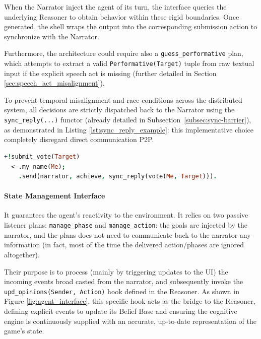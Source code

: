 When the Narrator inject the agent of its turn, the interface queries the underlying Reasoner to obtain behavior within these rigid boundaries. Once generated, the shell wraps the output into the corresponding submission action to synchronize with the Narrator. 

Furthermore, the architecture could require also a \texttt{guess\_performative} plan, which attempts to extract a valid \texttt{Performative(Target)} tuple from raw textual input if the explicit speech act is missing (further detailed in Section \ref{sec:speech_act_misalignment}).

To prevent temporal misalignment and race conditions across the distributed system, all decisions are strictly dispatched back to the Narrator using the \texttt{sync\_reply(...)} functor (already detailed in Subsection~\ref{subsec:sync-barrier}), as demonstrated in Listing \ref{lst:sync_reply_example}: this implementative choice completely disregard direct communication P2P.

\vspace{1em}
\begin{lstlisting}[frame=single, language=Prolog, caption={An example of a submission helper enforcing synchronization by exclusively replying to the Narrator.}, label={lst:sync_reply_example}]
+!submit_vote(Target) 
  <-.my_name(Me);
    .send(narrator, achieve, sync_reply(vote(Me, Target))).
\end{lstlisting}



\paragraph{State Management Interface} It guarantees the agent's reactivity to the environment. It relies on two passive listener plans: \texttt{manage\_phase} and \texttt{manage\_action}: the goals are injected by the narrator, and the plans does not need to communicate back to the narrator any information (in fact, most of the time the delivered action/phases are ignored altogether). 

Their purpose is to process (mainly by triggering updates to the UI) the incoming events broad casted from the narrator,  and subsequently invoke the \texttt{upd\_opinions(Sender, Action)} hook defined in the Reasoner. As shown in Figure \ref{fig:agent_interface}, this specific hook acts as the bridge to the Reasoner, defining explicit events to update its Belief Base and ensuring the cognitive engine is continuously supplied with an accurate, up-to-date representation of the game's state.


